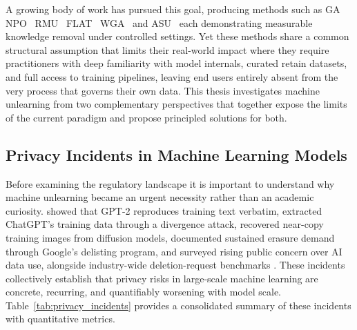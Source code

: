 A growing body of work has pursued this goal, producing methods such as GA~\citeauthor{yao2024large} NPO~\citeauthor{zhang2024negative} RMU~\citeauthor{li2024wmdp} FLAT~\citeauthor{wang2024llm} WGA~\citeauthor{wang2025rethinking} and ASU~\citeauthor{zade2026attention} each demonstrating measurable knowledge removal under controlled settings. Yet these methods share a common structural assumption that limits their real-world impact where they require practitioners with deep familiarity with model internals, curated retain datasets, and full access to training pipelines, leaving end users entirely absent from the very process that governs their own data. This thesis investigates machine unlearning from two complementary perspectives that together expose the limits of the current paradigm and propose principled solutions for both.


\subsection{Privacy Incidents in Machine Learning Models}

Before examining the regulatory landscape it is important to understand why machine unlearning became an urgent necessity rather than an academic curiosity. \citeauthor{carlini2021extracting} showed that GPT-2 reproduces training text verbatim, \citeauthor{nasr2023scalable} extracted ChatGPT's training data through a divergence attack, \citeauthor{carlini2023extracting} recovered near-copy training images from diffusion models, \citeauthor{bertram2019five} documented sustained erasure demand through Google's delisting program, and \citeauthor{kennedy_et_al_2025} surveyed rising public concern over AI data use, alongside industry-wide deletion-request benchmarks \cite{datagrail2024}. These incidents collectively establish that privacy risks in large-scale machine learning are concrete, recurring, and quantifiably worsening with model scale. Table~\ref{tab:privacy_incidents} provides a consolidated summary of these incidents with quantitative metrics.

